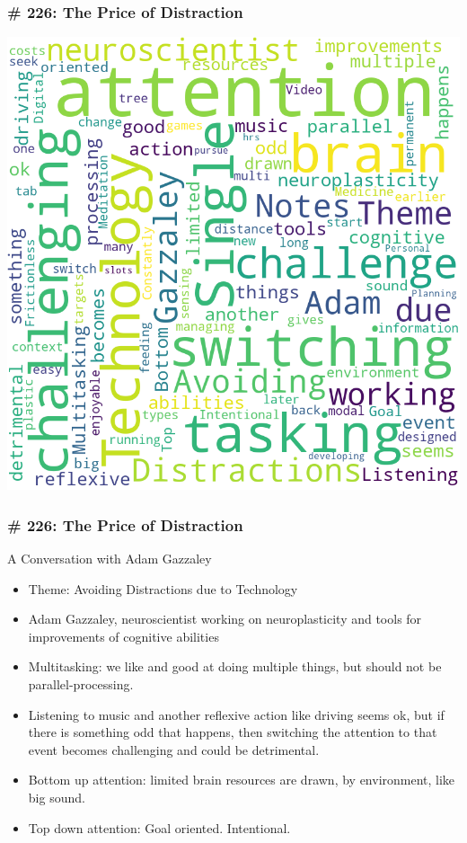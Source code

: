 \begin{frame}[fragile]
\frametitle{\# 226: The Price of Distraction}


 \begin{center}

\includegraphics[width=0.6\linewidth,keepaspectratio]{images/Review_Podcast_MakingSense_226_PriceOfDistraction}
\end{center}

\end{frame}

\begin{frame}[fragile]
\frametitle{\# 226: The Price of Distraction}

 A Conversation with Adam Gazzaley

\begin{itemize}
\item Theme: Avoiding Distractions due to Technology
\item Adam Gazzaley, neuroscientist working on neuroplasticity and tools for improvements of cognitive abilities
\item Multitasking: we like and good at doing multiple things, but should not be parallel-processing. 
\item Listening to music and another reflexive action like driving seems ok, but if there is something odd that happens, then switching the attention to that event becomes challenging and could be detrimental.
\item Bottom up attention: limited brain resources are drawn, by environment, like big sound.
\item Top down attention: Goal oriented. Intentional.
\end{itemize}


\end{frame}

